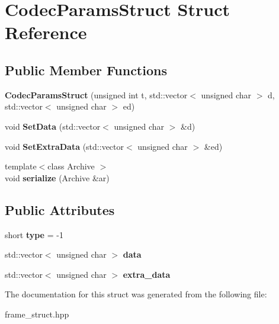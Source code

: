 \hypertarget{structCodecParamsStruct}{}\section{Codec\+Params\+Struct Struct Reference}
\label{structCodecParamsStruct}
\subsection*{Public Member Functions}
\begin{DoxyCompactItemize}
\item 
\mbox{\label{structCodecParamsStruct_a0a8eec06fd2e35cf57d0291aad702bea}} 
{\bfseries Codec\+Params\+Struct} (unsigned int t, std\+::vector$<$ unsigned char $>$ d, std\+::vector$<$ unsigned char $>$ ed)
\item 
\mbox{\label{structCodecParamsStruct_a43502f9c3184352ba19a6ccee5b11095}} 
void {\bfseries Set\+Data} (std\+::vector$<$ unsigned char $>$ \&d)
\item 
\mbox{\label{structCodecParamsStruct_abd3f54ad8e951cdd9775d23f10de5759}} 
void {\bfseries Set\+Extra\+Data} (std\+::vector$<$ unsigned char $>$ \&ed)
\item 
\mbox{\label{structCodecParamsStruct_a11373008391642f694a54908dc07d3bf}} 
{\footnotesize template$<$class Archive $>$ }\\void {\bfseries serialize} (Archive \&ar)
\end{DoxyCompactItemize}
\subsection*{Public Attributes}
\begin{DoxyCompactItemize}
\item 
\mbox{\label{structCodecParamsStruct_aa10891103382837562fb1c815e8c585d}} 
short {\bfseries type} = -\/1
\item 
\mbox{\label{structCodecParamsStruct_aead24e8b74890eba1c062f51d4108a59}} 
std\+::vector$<$ unsigned char $>$ {\bfseries data}
\item 
\mbox{\label{structCodecParamsStruct_af176a1835c0f426fa3e9f21730db5ac3}} 
std\+::vector$<$ unsigned char $>$ {\bfseries extra\+\_\+data}
\end{DoxyCompactItemize}


The documentation for this struct was generated from the following file\+:\begin{DoxyCompactItemize}
\item 
frame\+\_\+struct.\+hpp\end{DoxyCompactItemize}
